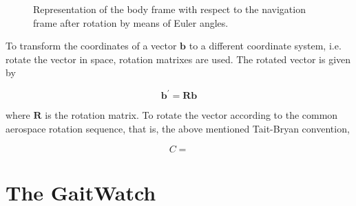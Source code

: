 \begin{figure}
\begin{subfigure}[]{0.45\textwidth}
{
}
\end{subfigure}
\caption{Representation of the body frame with respect to the navigation frame after rotation by means of Euler angles.}
	\label{fig:Euler_angles}
\end{figure}

To transform the coordinates of a vector $\mathbf{b}$ to a different coordinate system, i.e. rotate the vector in space, rotation matrixes are used. The rotated vector is given by

\begin{equation}
  \mathbf{b^{'}} = \mathbf{R} \mathbf{b}
\end{equation}

where $\mathbf{R}$ is the rotation matrix. To rotate the vector according to the common aerospace rotation sequence, that is, the above mentioned Tait-Bryan convention, 


\begin{equation}
C =
\end{equation}
\noindent
\resizebox{\linewidth}{!}{%
$ \begin{pmatrix}
   \cos \theta \cos \psi &
    \cos \theta \sin \psi &
   -\sin \theta \\
    \sin \phi \sin \theta \cos \psi - \cos \phi \sin \psi &
    \sin \phi \sin \theta \sin \psi + \cos \phi \cos \psi &
    \sin \phi \cos \theta \\
    \cos \phi \sin \theta \cos \psi + \sin \phi \sin \psi &
    \cos \phi \sin \theta \sin \psi - \sin \phi \cos \psi &
    \cos \phi \cos \theta
  \end{pmatrix} $
}

\section{The GaitWatch}

